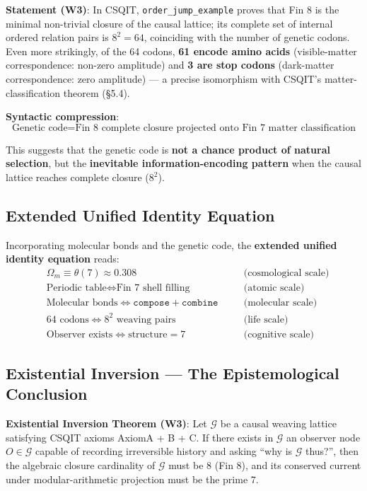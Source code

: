 \documentclass[aps,prd,twocolumn,nofootinbib,floatfix]{revtex4-2}
\begin{document}
\textbf{Statement (W3)}: In CSQIT, \texttt{order\_jump\_example} proves that Fin 8 is the minimal non-trivial closure of the causal lattice; its complete set of internal ordered relation pairs is $8^2 = 64$, coinciding with the number of genetic codons. Even more strikingly, of the 64 codons, \textbf{61 encode amino acids} (visible-matter correspondence: non-zero amplitude) and \textbf{3 are stop codons} (dark-matter correspondence: zero amplitude) --- a precise isomorphism with CSQIT's matter-classification theorem (\S 5.4).

\textbf{Syntactic compression}:
\[
\boxed{\text{Genetic code} = \text{Fin 8 complete closure projected onto Fin 7 matter classification}}
\]

This suggests that the genetic code is \textbf{not a chance product of natural selection}, but the \textbf{inevitable information-encoding pattern} when the causal lattice reaches complete closure ($8^2$).

\subsection{Extended Unified Identity Equation}

Incorporating molecular bonds and the genetic code, the \textbf{extended unified identity equation} reads:
\[
\boxed{
\begin{aligned}
&\Omega_m \equiv \theta(7) \approx 0.308 \quad &&\text{(cosmological scale)} \\
&\text{Periodic table} \iff \text{Fin 7 shell filling} \quad &&\text{(atomic scale)} \\
&\text{Molecular bonds} \iff \texttt{compose} + \texttt{combine} \quad &&\text{(molecular scale)} \\
&64\text{ codons} \iff 8^2\text{ weaving pairs} \quad &&\text{(life scale)} \\
&\text{Observer exists} \iff \text{structure}=7 \quad &&\text{(cognitive scale)}
\end{aligned}
}
\]

\subsection{Existential Inversion --- The Epistemological Conclusion}

\textbf{Existential Inversion Theorem (W3)}: Let $\mathcal{G}$ be a causal weaving lattice satisfying CSQIT axioms AxiomA + B + C. If there exists in $\mathcal{G}$ an observer node $O \in \mathcal{G}$ capable of recording irreversible history and asking ``why is $\mathcal{G}$ thus?'', then the algebraic closure cardinality of $\mathcal{G}$ must be 8 (Fin 8), and its conserved current under modular-arithmetic projection must be the prime 7.
\end{document}

